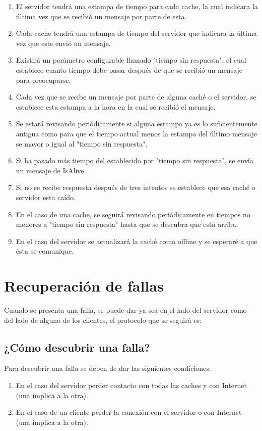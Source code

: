 \begin{enumerate}
\item El servidor tendrá una estampa de tiempo para cada cache, la cual indicara la última vez que se recibió un mensaje por parte de esta.
\item Cada cache tendrá una estampa de tiempo del servidor que indicara la última vez que este envió un mensaje.
\item Existirá un parámetro configurable llamado "tiempo sin respuesta", el cual establece cuanto tiempo debe pasar después de que se recibió un mensaje para preocuparse.
\item Cada vez que se recibe un mensaje por parte de alguna caché o el servidor, se establece esta estampa a la hora en la cual se recibió el mensaje.
\item Se estará revisando periódicamente si alguna estampa ya es lo suficientemente antigua como para que el tiempo actual menos la estampa del último mensaje se mayor o igual al "tiempo sin respuesta".
\item Si ha pasado más tiempo del establecido por "tiempo sin respuesta", se envía un mensaje de IsAlive.
\item Si no se recibe respuesta después de tres intentos se establece que esa caché o servidor esta caído.
\item En el caso de una cache, se seguirá revisando periódicamente en tiempos no menores a "tiempo sin respuesta" hasta que se descubra que está arriba.
\item En el caso del servidor se actualizará la caché como offline y se esperaré a que ésta se comunique.
\end{enumerate}

\section{Recuperación de fallas}
Cuando se presenta una falla, se puede dar ya sea en el lado del servidor como del lado de alguno de los clientes, el protocolo que se seguirá es:

\subsection{¿Cómo descubrir una falla?}
Para descubrir una falla se deben de dar las siguientes condiciones:
\begin{enumerate}
\item En el caso del servidor perder contacto con todas las caches y con Internet (una implica a la otra).
\item En el caso de un cliente perder la conexión con el servidor o con Internet (una implica a la otra). 
\end{enumerate}

